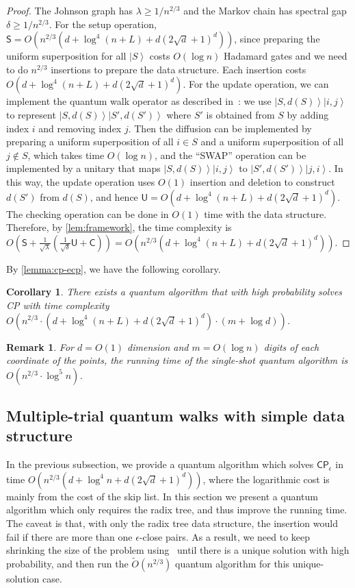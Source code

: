 \documentclass[10pt,a4paper]{article}
\newtheorem{corollary}[theorem]{Corollary}
\newtheorem{remark}[theorem]{Remark}
\newcommand{\wt}{\widetilde}
\renewcommand{\varepsilon}{\lambda}
\renewcommand{\tilde}{\wt}
\newcommand{\ket}[1]{\left| #1 \right\rangle}
\newcommand{\eCP}{\mathsf{CP}_{\epsilon}}
\begin{document}
\begin{proof}
  The Johnson graph has $\varepsilon \geq 1/n^{2/3}$ and the Markov chain has spectral gap $\delta \geq 1/n^{2/3}$. For the setup operation, $\mathsf{S} = O(n^{2/3}(d+\log^4(n+L) + d(2\sqrt{d}+1)^d))$, since preparing the uniform superposition for all $\ket{S}$ costs $O(\log n)$ Hadamard gates and we need to do $n^{2/3}$ insertions to prepare the data structure. Each insertion costs $O(d+\log^4(n+L) + d(2\sqrt{d}+1)^d)$. For the update operation, we can implement the quantum walk operator as described in~\cite{r28}: we use $\ket{S,d(S)}\ket{i,j}$ to represent $\ket{S,d(S)}\ket{S',d(S')}$ where $S'$ is obtained from $S$ by adding index $i$ and removing index $j$. Then the diffusion can be implemented by preparing a uniform superposition of all $i \in S$ and a uniform superposition of all $j \not\in S$, which takes time $O(\log n)$, and the ``SWAP'' operation can be implemented by a unitary that maps $\ket{S, d(S)}\ket{i,j}$ to $\ket{S',d(S')}\ket{j,i}$. In this way, the update operation uses $O(1)$ insertion and deletion to construct $d(S')$ from $d(S)$, and hence $\mathsf{U} = O(d+\log^4(n+L) + d(2\sqrt{d}+1)^d)$. The checking operation can be done in $O(1)$ time with the data structure. Therefore, by \cref{lem:framework}, the time complexity is $O(\mathsf{S} + \frac{1}{\sqrt{\varepsilon}}(\frac{1}{\sqrt{\delta}}\mathsf{U} + \mathsf{C})) = O(n^{2/3}(d+\log^4(n+L) + d(2\sqrt{d}+1)^d))$.
\end{proof}

By \cref{lemma:cp-ecp}, we have the following corollary.
\begin{corollary}
  There exists a quantum algorithm that with high probability solves \textsf{CP} with time complexity $O(n^{2/3}\cdot (d+\log^4(n+L) + d(2\sqrt{d}+1)^d)\cdot (m+\log d))$.
\end{corollary}

\begin{remark}
For $d=O(1)$ dimension and $m=O(\log n)$ digits of each coordinate of the points, the running time of the single-shot quantum algorithm is $O(n^{2/3}\cdot \log^5 n)$.
\end{remark}

\subsection{Multiple-trial quantum walks with simple data structure}
\label{sec:multi-shots}

In the previous subsection, we provide a quantum algorithm which solves $\eCP$ in time $O(n^{2/3}(d+\log^4 n + d(2\sqrt{d}+1)^d))$, where the logarithmic cost is mainly from the cost of the skip list. In this section we present a quantum algorithm which only requires the radix tree, and thus improve the running time. 
The caveat is that, with only the radix tree data structure, the insertion would fail if there are more than one $\epsilon$-close pairs. As a result, we need to keep shrinking the size of the problem using~\cite[Algorithm 3]{r5} until there is a unique solution with high probability, and then run the $\tilde{O}(n^{2/3})$ quantum algorithm for this unique-solution case. 
\end{document}
